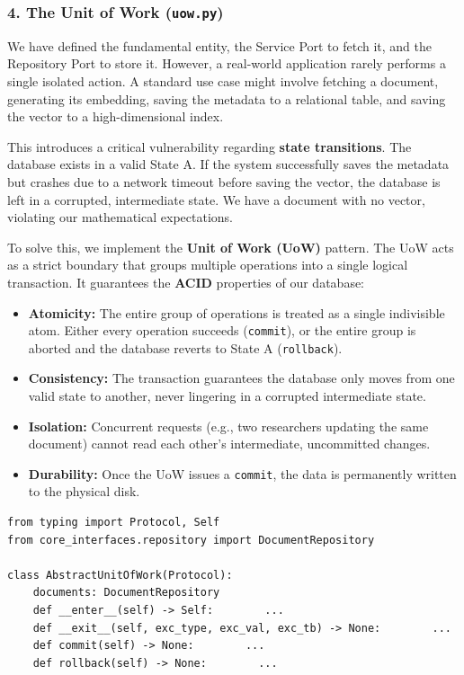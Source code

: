 \subsubsection*{4. The Unit of Work (\texttt{uow.py})}

We have defined the fundamental entity, the Service Port to fetch it, and the Repository Port to store it. However, a real-world application rarely performs a single isolated action. A standard use case might involve fetching a document, generating its embedding, saving the metadata to a relational table, and saving the vector to a high-dimensional index.

This introduces a critical vulnerability regarding \textbf{state transitions}. The database exists in a valid State A. If the system successfully saves the metadata but crashes due to a network timeout before saving the vector, the database is left in a corrupted, intermediate state. We have a document with no vector, violating our mathematical expectations.

To solve this, we implement the \textbf{Unit of Work (UoW)} pattern. The UoW acts as a strict boundary that groups multiple operations into a single logical transaction. It guarantees the \textbf{ACID} properties of our database:
\begin{itemize}
    \item \textbf{Atomicity:} The entire group of operations is treated as a single indivisible atom. Either every operation succeeds (\texttt{commit}), or the entire group is aborted and the database reverts to State A (\texttt{rollback}).
    \item \textbf{Consistency:} The transaction guarantees the database only moves from one valid state to another, never lingering in a corrupted intermediate state.
    \item \textbf{Isolation:} Concurrent requests (e.g., two researchers updating the same document) cannot read each other's intermediate, uncommitted changes.
    \item \textbf{Durability:} Once the UoW issues a \texttt{commit}, the data is permanently written to the physical disk.
\end{itemize}

\begin{lstlisting}[caption={The Unit of Work Protocol}]
from typing import Protocol, Self
from core_interfaces.repository import DocumentRepository

class AbstractUnitOfWork(Protocol):
    documents: DocumentRepository
    def __enter__(self) -> Self:        ...
    def __exit__(self, exc_type, exc_val, exc_tb) -> None:        ...
    def commit(self) -> None:        ...
    def rollback(self) -> None:        ...
\end{lstlisting}

